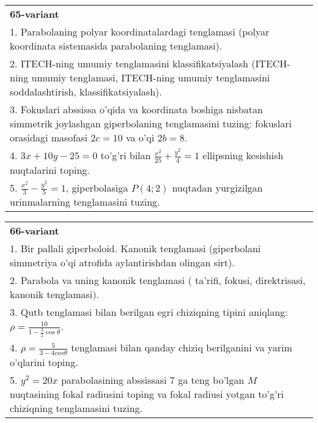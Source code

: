 \documentclass{article}
\begin{document}
\begin{tabular}{m{17cm}}
\textbf{65-variant}\\
1. Parabolaning polyar koordinatalardagi tenglamasi (polyar koordinata sistemasida parabolaning tenglamasi).\\

2. ITECH-ning umumiy tenglamasini klassifikatsiyalash (ITECH-ning umumiy tenglamasi, ITECH-ning umumiy tenglamasini soddalashtirish, klassifikatsiyalash).\\

3. Fokuslari abssissa o'qida va koordinata boshiga nisbatan simmetrik joylashgan giperbolaning tenglamasini tuzing: fokuslari orasidagi masofasi $2c=10$ va o'qi $2b=8$.\\

4. $3x + 10y - 25 = 0$ to'g'ri bilan $\frac{x^{2}}{25} + \frac{y^{2}}{4} = 1$ ellipsning kesishish nuqtalarini toping.  \\

5. $\frac{x^{2}}{3} - \frac{y^{2}}{5} = 1$, giperbolasiga $P(4;2)$ nuqtadan yurgizilgan urinmalarning tenglamasini tuzing.  
\end{tabular}
\vspace{1cm}


\begin{tabular}{m{17cm}}
\textbf{66-variant}\\
1. Bir pallali giperboloid. Kanonik tenglamasi (giperbolani simmetriya o'qi atrofida aylantirishdan olingan sirt).\\

2. Parabola va uning kanonik tenglamasi ( ta'rifi, fokusi, direktrisasi, kanonik tenglamasi).\\

3. Qutb tenglamasi bilan berilgan egri chiziqning tipini aniqlang: $\rho=\frac{10}{1-\frac{3}{2}\cos\theta}$.\\

4. $\rho = \frac{5}{3 - 4cos\theta}$ tenglamasi bilan qanday chiziq berilganini va yarim o'qlarini toping.  \\

5. $y^{2} = 20x$ parabolasining abssissasi 7 ga teng bo'lgan $M$ nuqtasining fokal radiusini toping va fokal radiusi yotgan to'g'ri chiziqning tenglamasini tuzing.  
\end{tabular}
\vspace{1cm}
\end{document}
